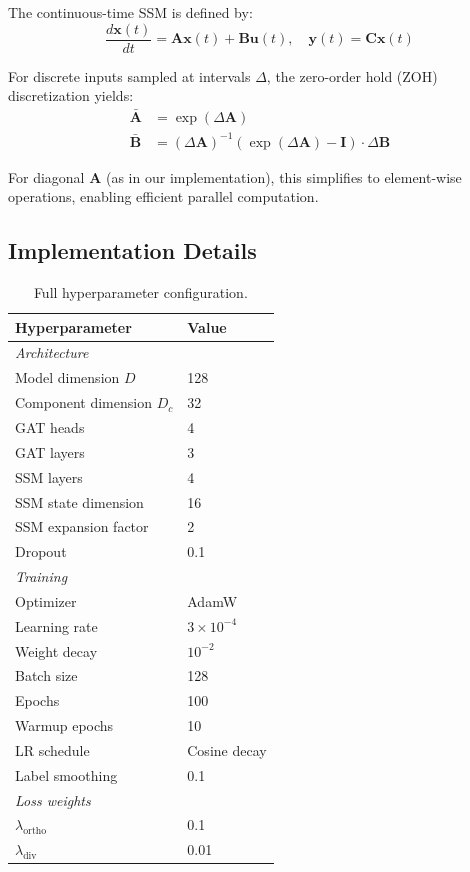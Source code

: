 \documentclass[sigconf,nonacm,anonymous]{acmart}
\theoremstyle{definition}
\theoremstyle{remark}
\begin{document}
The continuous-time SSM is defined by:
\begin{equation}
\frac{d\mathbf{x}(t)}{dt} = \mathbf{A}\mathbf{x}(t) + \mathbf{B}\mathbf{u}(t), \quad \mathbf{y}(t) = \mathbf{C}\mathbf{x}(t)
\end{equation}

For discrete inputs sampled at intervals $\Delta$, the zero-order hold (ZOH) discretization yields:
\begin{align}
\bar{\mathbf{A}} &= \exp(\Delta \mathbf{A}) \\
\bar{\mathbf{B}} &= (\Delta \mathbf{A})^{-1}(\exp(\Delta \mathbf{A}) - \mathbf{I}) \cdot \Delta \mathbf{B}
\end{align}

For diagonal $\mathbf{A}$ (as in our implementation), this simplifies to element-wise operations, enabling efficient parallel computation.

\subsection{Implementation Details}

\begin{table}[ht]
\caption{Full hyperparameter configuration.}
\label{tab:hyperparams}
\begin{center}
\small
\begin{tabular}{ll}
\toprule
Hyperparameter & Value \\
\midrule
\multicolumn{2}{l}{\textit{Architecture}} \\
Model dimension $D$ & 128 \\
Component dimension $D_c$ & 32 \\
GAT heads & 4 \\
GAT layers & 3 \\
SSM layers & 4 \\
SSM state dimension & 16 \\
SSM expansion factor & 2 \\
Dropout & 0.1 \\
\midrule
\multicolumn{2}{l}{\textit{Training}} \\
Optimizer & AdamW \\
Learning rate & $3 \times 10^{-4}$ \\
Weight decay & $10^{-2}$ \\
Batch size & 128 \\
Epochs & 100 \\
Warmup epochs & 10 \\
LR schedule & Cosine decay \\
Label smoothing & 0.1 \\
\midrule
\multicolumn{2}{l}{\textit{Loss weights}} \\
$\lambda_{\text{ortho}}$ & 0.1 \\
$\lambda_{\text{div}}$ & 0.01 \\
\bottomrule
\end{tabular}
\end{center}
\end{table}
\end{document}

